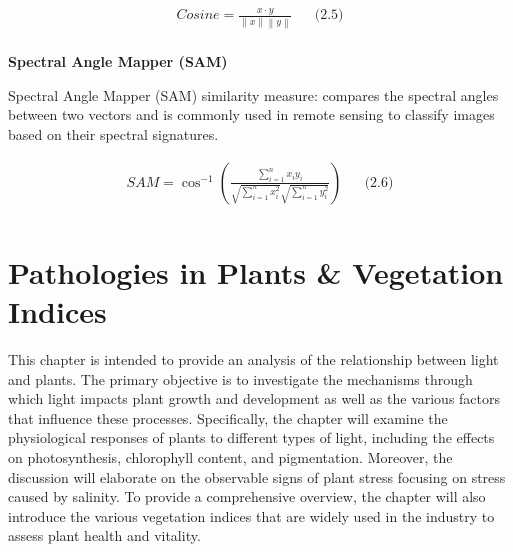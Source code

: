 \documentclass{article}
\begin{document}
{                    \begin{align*}
                        Cosine = \frac{x \cdot y}{\left\lVert x \right\rVert \left\lVert y \right\rVert} && \text{(2.5)} \\
                    \end{align*}
                    \vspace*{2\baselineskip}
                    
                    \vspace*{1\baselineskip}
                    \textbf{Spectral Angle Mapper (SAM)}\par
                    \vspace*{1\baselineskip}

                    Spectral Angle Mapper (SAM) similarity measure: compares the spectral angles between two vectors and is commonly used in remote sensing to classify images based on their spectral signatures.\par
                    
                    
                    \begin{align*}
                        SAM = \cos^{-1}\left(\frac{\sum_{i=1}^n x_i y_i}{\sqrt{\sum_{i=1}^n x_i^2} \sqrt{\sum_{i=1}^n y_i^2}}\right) && \text{(2.6)} \\ 
                    \end{align*}
                    \newpage
                    
        \section{Pathologies in Plants \& Vegetation Indices}
            \setcounter{figure}{0}
            \hspace{0.5cm}This chapter is intended to provide an analysis of the relationship between light and plants. The primary objective is to investigate the mechanisms through which light impacts plant growth and development as well as the various factors that influence these processes. Specifically, the chapter will examine the physiological responses of plants to different types of light, including the effects on photosynthesis, chlorophyll content, and pigmentation. Moreover, the discussion will elaborate on the observable signs of plant stress focusing on stress caused by salinity. To provide a comprehensive overview, the chapter will also introduce the various vegetation indices that are widely used in the industry to assess plant health and vitality.
}
\end{document}
